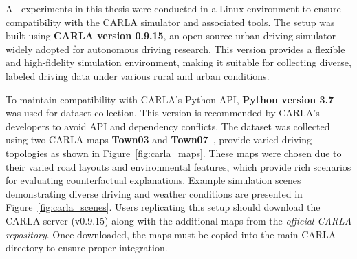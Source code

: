 All experiments in this thesis were conducted in a Linux environment to ensure compatibility with the CARLA simulator and associated tools. The setup was built using \textbf{CARLA version 0.9.15}, an open-source urban driving simulator widely adopted for autonomous driving research. This version provides a flexible and high-fidelity simulation environment, making it suitable for collecting diverse, labeled driving data under various rural and urban conditions.

To maintain compatibility with CARLA’s Python API, \textbf{Python version 3.7} was used for dataset collection. This version is recommended by CARLA’s developers to avoid API and dependency conflicts. The dataset was collected using two CARLA maps \textbf{Town03} and \textbf{Town07}~\cite{CARLA2024}, provide varied driving topologies as shown in Figure~\ref{fig:carla_maps}. These maps were chosen due to their varied road layouts and environmental features, which provide rich scenarios for evaluating counterfactual explanations. Example simulation scenes demonstrating diverse driving and weather conditions are presented in Figure~\ref{fig:carla_scenes}. Users replicating this setup should download the CARLA server (v0.9.15) along with the additional maps from the \textit{official CARLA repository}. Once downloaded, the maps must be copied into the main CARLA directory to ensure proper integration.

